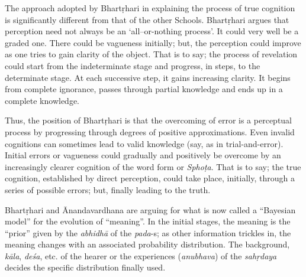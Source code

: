 \begin{myquote}
The approach adopted by Bhartṛhari in explaining the process of true cognition is significantly different from that of the other Schools. Bhartṛhari argues that perception need not always be an ‘all–or-nothing process’. It could very well be a graded one. There could be vagueness initially; but, the perception could improve as one tries to gain clarity of the object. That is to say; the process of revelation could start from the indeterminate stage and progress, in steps, to the determinate stage. At each successive step, it gains increasing clarity. It begins from complete ignorance, passes through partial knowledge and ends up in a complete knowledge.

Thus, the position of Bhartṛhari is that the overcoming of error is a perceptual process by progressing through degrees of positive approximations. Even invalid cognitions can sometimes lead to valid knowledge (say, as in trial-and-error). Initial errors or vagueness could gradually and positively be overcome by an increasingly clearer cognition of the word form or \textsl{Sphoṭa}. That is to say; the true cognition, established by direct perception, could take place, initially, through a series of possible errors; but, finally leading to the truth.
\end{myquote}

Bhartṛhari and Ānandavardhana are arguing for what is now called a “Bayesian model” for the evolution of “meaning”. In the initial stages, the meaning is the “prior” given by the \textsl{abhidhā} of the \textsl{pada}-s; as other information trickles in, the meaning changes with an associated probability distribution. The background, \textsl{kāla}, \textsl{deśa}, etc. of the hearer or the experiences (\textsl{anubhava}) of the \textsl{sahṛdaya} decides the specific distribution finally used. 

